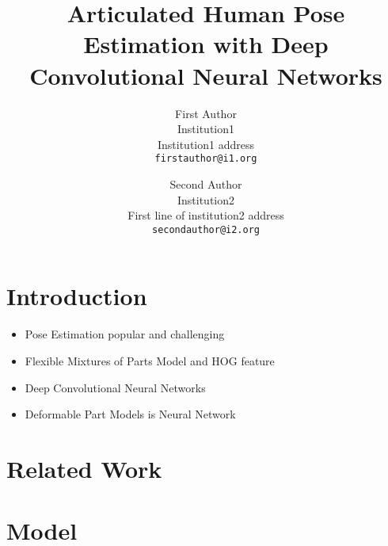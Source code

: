 \documentclass[10pt,twocolumn,letterpaper]{article}
\begin{document}
\title{Articulated Human Pose Estimation with Deep Convolutional Neural Networks}

\author{First Author\\
Institution1\\
Institution1 address\\
{\tt\small firstauthor@i1.org}
\and
Second Author\\
Institution2\\
First line of institution2 address\\
{\tt\small secondauthor@i2.org}
}

\maketitle

\begin{abstract}
\end{abstract}

\section{Introduction}
\begin{itemize}
  \item Pose Estimation popular and challenging
  \item Flexible Mixtures of Parts Model and HOG feature
  \item Deep Convolutional Neural Networks
  \item Deformable Part Models is Neural Network
\end{itemize}

\section{Related Work}

\section{Model} 
\end{document}
